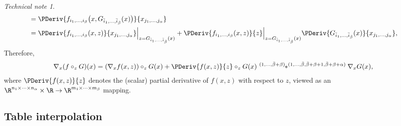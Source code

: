 \documentclass[11pt]{article}
\newcommand{\tprod}[2]{\,\,^{#1}\!\!*^{#2}}
\theoremstyle{remark}
\newtheorem{technical}{Technical note}
\begin{document}
\begin{technical}
\begin{align*}
  &=\PDeriv{ f_{i_1,\dots,i_\beta}\big(x,G_{\bar i_1,\dots,\bar i_{\bar \beta}}(x)\big)}{x_{j_1,\dots,j_\alpha}}\\
  &=\PDeriv{f_{i_1,\dots,i_\beta}(x,z)}{x_{j_1,\dots,j_\alpha}}\Big|_{z=G_{\bar i_1,\dots,\bar i_{\bar \beta}}(x)}
  +\PDeriv{f_{i_1,\dots,i_\beta}(x,z)}{z}\Big|_{z=G_{\bar i_1,\dots,\bar i_{\bar \beta}}(x)}\PDeriv{G_{\bar i_1,\dots,\bar i_{\bar \beta}}(x)}{x_{j_1,\dots,j_\alpha}},
\end{align*}
Therefore,
\begin{align*}
  \nabla_x(f\circ_z G)(x)=(\nabla_x f(x,z))\circ_z G(x)+
  \PDeriv{f(x,z)}{z}\circ_z G(x)\tprod{(1,\dots,\bar \beta+\beta)}{(1,\dots,\bar\beta,\bar\beta+\beta+1,\bar\beta+\beta+\alpha)} \nabla_x G(x),
\end{align*}
where $\PDeriv{f(x,z)}{z}$ denotes the (scalar) partial derivative of
$f(x,z)$ with respect to $z$, viewed as an $\R^{n_1\times\cdots\times n_\alpha}\times\R\to\R^{m_1\times\cdots\times
  m_\beta}$ mapping.\frqed
\end{technical}

\subsection{Table interpolation}
\end{document}
